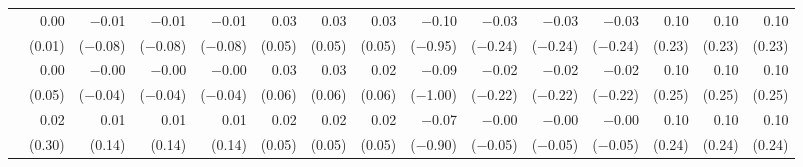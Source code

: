 \begin{tabularx}{1.45\textwidth}{lRRRRRRRRRRRRRR}
		 & \num{0.00}\phantom{***)} & \num{-0.01}\phantom{***)} & \num{-0.01}\phantom{***)} & \num{-0.01}\phantom{***)} & \num{0.03}\phantom{***)} & \num{0.03}\phantom{***)} & \num{0.03}\phantom{***)} & \num{-0.10}\phantom{***)} & \num{-0.03}\phantom{***)} & \num{-0.03}\phantom{***)} & \num{-0.03}\phantom{***)} & \num{0.10}\phantom{***)} & \num{0.10}\phantom{***)} & \num{0.10}\phantom{***)} \\
		 & (\num{0.01})\phantom{***} & (\num{-0.08})\phantom{***} & (\num{-0.08})\phantom{***} & (\num{-0.08})\phantom{***} & (\num{0.05})\phantom{***} & (\num{0.05})\phantom{***} & (\num{0.05})\phantom{***} & (\num{-0.95})\phantom{***} & (\num{-0.24})\phantom{***} & (\num{-0.24})\phantom{***} & (\num{-0.24})\phantom{***} & (\num{0.23})\phantom{***} & (\num{0.23})\phantom{***} & (\num{0.23})\phantom{***} \\ [\dspacing]
		 & \num{0.00}\phantom{***)} & \num{-0.00}\phantom{***)} & \num{-0.00}\phantom{***)} & \num{-0.00}\phantom{***)} & \num{0.03}\phantom{***)} & \num{0.03}\phantom{***)} & \num{0.02}\phantom{***)} & \num{-0.09}\phantom{***)} & \num{-0.02}\phantom{***)} & \num{-0.02}\phantom{***)} & \num{-0.02}\phantom{***)} & \num{0.10}\phantom{***)} & \num{0.10}\phantom{***)} & \num{0.10}\phantom{***)} \\
		 & (\num{0.05})\phantom{***} & (\num{-0.04})\phantom{***} & (\num{-0.04})\phantom{***} & (\num{-0.04})\phantom{***} & (\num{0.06})\phantom{***} & (\num{0.06})\phantom{***} & (\num{0.06})\phantom{***} & (\num{-1.00})\phantom{***} & (\num{-0.22})\phantom{***} & (\num{-0.22})\phantom{***} & (\num{-0.22})\phantom{***} & (\num{0.25})\phantom{***} & (\num{0.25})\phantom{***} & (\num{0.25})\phantom{***} \\ [\dspacing]
		 & \num{0.02}\phantom{***)} & \num{0.01}\phantom{***)} & \num{0.01}\phantom{***)} & \num{0.01}\phantom{***)} & \num{0.02}\phantom{***)} & \num{0.02}\phantom{***)} & \num{0.02}\phantom{***)} & \num{-0.07}\phantom{***)} & \num{-0.00}\phantom{***)} & \num{-0.00}\phantom{***)} & \num{-0.00}\phantom{***)} & \num{0.10}\phantom{***)} & \num{0.10}\phantom{***)} & \num{0.10}\phantom{***)} \\
		 & (\num{0.30})\phantom{***} & (\num{0.14})\phantom{***} & (\num{0.14})\phantom{***} & (\num{0.14})\phantom{***} & (\num{0.05})\phantom{***} & (\num{0.05})\phantom{***} & (\num{0.05})\phantom{***} & (\num{-0.90})\phantom{***} & (\num{-0.05})\phantom{***} & (\num{-0.05})\phantom{***} & (\num{-0.05})\phantom{***} & (\num{0.24})\phantom{***} & (\num{0.24})\phantom{***} & (\num{0.24})\phantom{***} \\ [\dspacing]

\end{tabularx}
